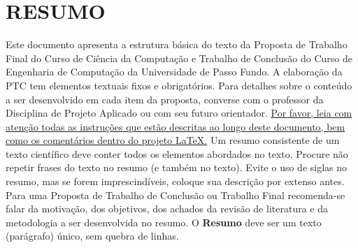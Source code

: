 \chapter{RESUMO}\label{chap:resumo}

Este documento apresenta a estrutura básica do texto da Proposta de Trabalho Final do Curso de Ciência da Computação e Trabalho de Conclusão do Curso de Engenharia de Computação da Universidade de Passo Fundo. A elaboração da PTC tem elementos textuais fixos e obrigatórios. Para detalhes sobre o conteúdo a ser desenvolvido em cada item da proposta, converse com o professor da Disciplina de Projeto Aplicado ou com seu futuro orientador. \ul{Por favor, leia com atenção todas as instruções que estão descritas ao longo deste documento, bem como os comentários dentro do projeto \LaTeX.} Um resumo consistente de um texto científico deve conter todos os elementos abordados no texto. Procure não repetir frases do texto no resumo (e também no texto). Evite o uso de siglas no resumo, mas se forem imprescindíveis, coloque sua descrição por extenso antes. Para uma Proposta de Trabalho de Conclusão ou Trabalho Final recomenda-se falar da motivação, dos objetivos, dos achados da revisão de literatura e da metodologia a ser desenvolvida no resumo. O \textbf{Resumo} deve ser um texto (parágrafo) único, sem quebra de linhas.

